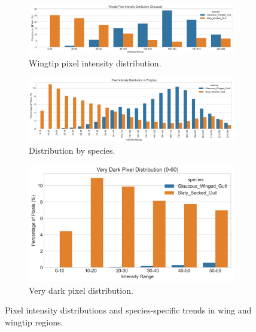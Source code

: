 \documentclass[a4paper,12pt]{report}
\begin{document}
\begin{figure}[H]
    \centering
    \begin{subfigure}[b]{0.32\textwidth}
        \centering
        \includegraphics[width=\textwidth]{images/REPORT_IMAGES_INTENSITY/I2/intensitydistribution.png}
        \caption{Wingtip pixel intensity distribution.}
        \label{fig:intensity_distribution}
    \end{subfigure}
    \hfill
    \begin{subfigure}[b]{0.32\textwidth}
        \centering
        \includegraphics[width=\textwidth]{images/REPORT_IMAGES_INTENSITY/I2/TIPdistribution.png}
        \caption{Distribution by species.}
        \label{fig:tip_distribution}
    \end{subfigure}
    \hfill
    \begin{subfigure}[b]{0.32\textwidth}
        \centering
        \includegraphics[width=\textwidth]{images/REPORT_IMAGES_INTENSITY/I2/verydarkdist.png}
        \caption{Very dark pixel distribution.}
        \label{fig:very_dark_dist}
    \end{subfigure}
    \caption{Pixel intensity distributions and species-specific trends in wing and wingtip regions.}
    \label{fig:intensity_dist_combined}
\end{figure}
\end{document}
